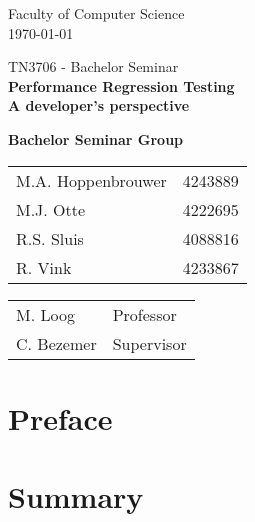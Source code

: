 \documentclass[oneside]{book}
\begin{document}
\frontmatter

\begin{titlepage}

\begin{center}
\begin{figure}[h!]
\centering
\end{figure}
Faculty of Computer Science \\
\today

\vspace{3.5cm}
\selectfont
{\Large TN3706 - Bachelor Seminar}\\
\vspace{0.0cm}
\Huge{\textbf{Performance Regression Testing\\ A developer's perspective}}
\vspace{0.5cm}
\selectfont

\vspace{5cm}
\normalsize{\textbf{Bachelor Seminar Group}}

\begin{tabular}{ l r}
\normalsize{M.A. Hoppenbrouwer} & \normalsize{4243889} \\
\normalsize{M.J. Otte} & \normalsize{4222695} \\
\normalsize{R.S. Sluis} & \normalsize{4088816} \\
\normalsize{R. Vink} & \normalsize{4233867}\\
\end{tabular}

\vspace{0.75cm}

\begin{tabular}{ l l }
\normalsize{M. Loog} & \normalsize{Professor} \\
\normalsize{C. Bezemer} & \normalsize{Supervisor} \\
\end{tabular}

\end{center}
\end{titlepage}

\chapter{Preface}
% 

\chapter{Summary}
% 
\end{document}
